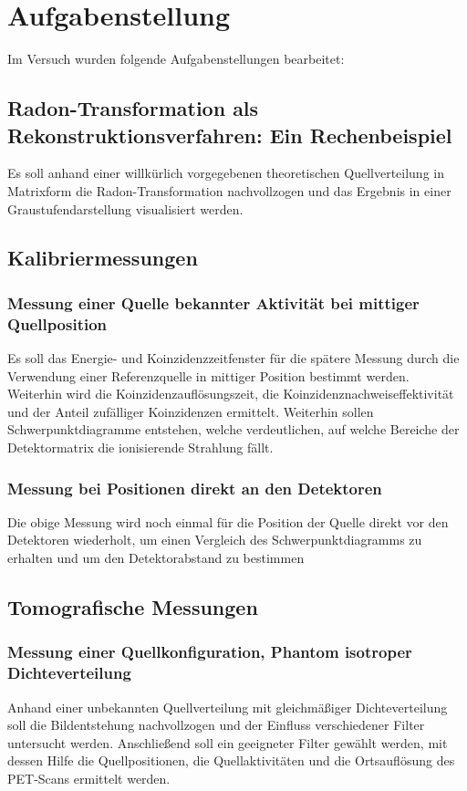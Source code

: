 \section{Aufgabenstellung}
Im Versuch wurden folgende Aufgabenstellungen bearbeitet:
\subsection{Radon-Transformation als Rekonstruktionsverfahren: Ein Rechenbeispiel}
Es soll anhand einer willkürlich vorgegebenen theoretischen Quellverteilung in Matrixform die Radon-Transformation nachvollzogen und das Ergebnis in einer Graustufendarstellung visualisiert werden.

\subsection{Kalibriermessungen}
	\subsubsection{Messung einer Quelle bekannter Aktivität bei mittiger Quellposition}
	Es soll das Energie- und Koinzidenzzeitfenster für die spätere Messung durch die Verwendung einer Referenzquelle in mittiger Position bestimmt werden. Weiterhin wird die Koinzidenzauflösungszeit, die Koinzidenznachweiseffektivität und der Anteil zufälliger Koinzidenzen ermittelt. Weiterhin sollen Schwerpunktdiagramme entstehen, welche verdeutlichen, auf welche Bereiche der Detektormatrix die ionisierende Strahlung fällt.
	\subsubsection{Messung bei Positionen direkt an den Detektoren}
	Die obige Messung wird noch einmal für die Position der Quelle direkt vor den Detektoren wiederholt, um einen Vergleich des Schwerpunktdiagramms zu erhalten und um den Detektorabstand zu bestimmen
	
\subsection{Tomografische Messungen}
	\subsubsection{Messung einer Quellkonfiguration, Phantom isotroper Dichteverteilung}
	Anhand einer unbekannten  Quellverteilung mit gleichmäßiger Dichteverteilung soll die Bildentstehung nachvollzogen und der Einfluss verschiedener Filter untersucht werden. Anschließend soll ein geeigneter Filter gewählt werden, mit dessen Hilfe die Quellpositionen, die Quellaktivitäten und die Ortsauflösung des PET-Scans ermittelt werden.
